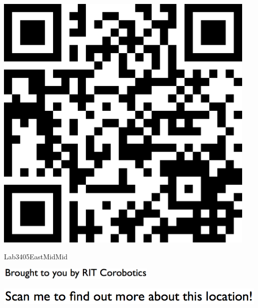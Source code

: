 \documentclass[letterpaper]{article}
\begin{document}
 \begingroup 
 \centerline{\includegraphics[scale=1,width=5in,height=5in]{Lab3405EastMidMid.png}} 
 \endgroup 
 \vspace*{\fill} 

 \hfill{\small Lab3405EastMidMid} 

  \vspace{0.7in} 
 
 \centerline{\includegraphics[scale=1,width=3in]{text-bottom.png}} 
 
 \pagebreak 
{} 
 \vspace*{\fill} 
 
  \centerline{\includegraphics[scale=1,width=6in]{text-top.png}} 
 
 \vspace{0.5in} 
 
\end{document}
